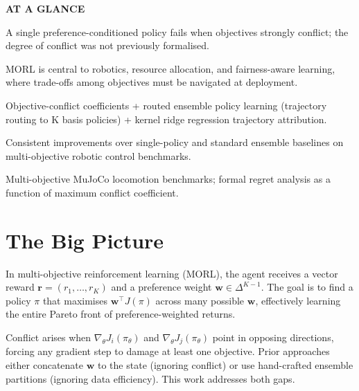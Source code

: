 \documentclass[10pt,twocolumn]{article}
\begin{document}
\begin{mdframed}[backgroundcolor=boxgray,linecolor=rulered,linewidth=1pt,
    innerleftmargin=6pt,innerrightmargin=6pt,
    innertopmargin=6pt,innerbottommargin=6pt]
\textbf{\small AT A GLANCE}\par\vspace{4pt}
\begin{description}[leftmargin=0pt,labelsep=4pt,itemsep=2pt,parsep=0pt,
    font=\small\bfseries]
  \item[Problem:] A single preference-conditioned policy fails when
    objectives strongly conflict; the degree of conflict was not
    previously formalised.
  \item[Why it matters:] MORL is central to robotics, resource
    allocation, and fairness-aware learning, where trade-offs among
    objectives must be navigated at deployment.
  \item[Method:] Objective-conflict coefficients + routed ensemble
    policy learning (trajectory routing to K basis policies) +
    kernel ridge regression trajectory attribution.
  \item[Result:] Consistent improvements over single-policy and
    standard ensemble baselines on multi-objective robotic control
    benchmarks.
  \item[Evidence:] Multi-objective MuJoCo locomotion benchmarks;
    formal regret analysis as a function of maximum conflict
    coefficient.
\end{description}
\end{mdframed}

\section{The Big Picture}

In multi-objective reinforcement learning (MORL), the agent receives a
vector reward $\mathbf{r} = (r_1, \ldots, r_K)$ and a preference
weight $\mathbf{w} \in \Delta^{K-1}$. The goal is to find a policy
$\pi$ that maximises $\mathbf{w}^\top J(\pi)$ across many possible
$\mathbf{w}$, effectively learning the entire Pareto front of
preference-weighted returns.

Conflict arises when $\nabla_\theta J_i(\pi_\theta)$ and
$\nabla_\theta J_j(\pi_\theta)$ point in opposing directions, forcing
any gradient step to damage at least one objective. Prior approaches
either concatenate $\mathbf{w}$ to the state (ignoring conflict) or
use hand-crafted ensemble partitions (ignoring data efficiency). This
work addresses both gaps.
\end{document}
